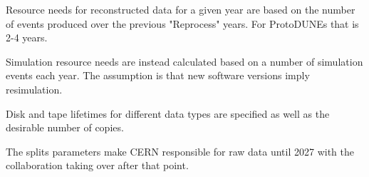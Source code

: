 \documentclass[12pt]{article}
\begin{document}
Resource needs for reconstructed data for a given year are based on the number of events produced over the previous "Reprocess" years.   For ProtoDUNEs that is 2-4 years. 

Simulation resource needs are instead calculated based on a number of simulation events each year. The assumption is that new software versions imply resimulation.

Disk and tape lifetimes for different data types are specified as well as the desirable number of copies. 

The splits parameters make CERN responsible for raw data until 2027 with the collaboration taking over after that point. 


\end{document}
